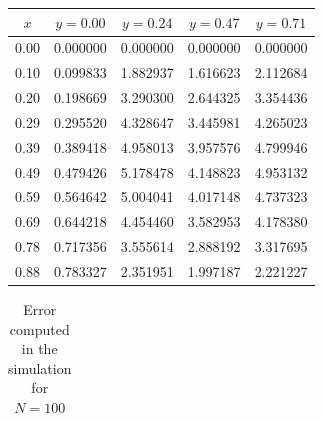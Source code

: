 \documentclass[aps,amsmath,amssymb,floatfix]{revtex4}
\begin{document}
\begin{enumerate}
\begin{enumerate}
\begin{table}[H]
\begin{tabular}{|c|c|c|c|c|}
	      	      		\textbf{$x$} & \textbf{$y = 0.00$} & \textbf{$y = 0.24$} & \textbf{$y = 0.47$} & \textbf{$y = 0.71$} \\ \hline
	      	      		0.00         & 0.000000            & 0.000000            & 0.000000            & 0.000000            \\ \hline
	      	      		0.10         & 0.099833            & 1.882937            & 1.616623            & 2.112684            \\ \hline
	      	      		0.20         & 0.198669            & 3.290300            & 2.644325            & 3.354436            \\ \hline
	      	      		0.29         & 0.295520            & 4.328647            & 3.445981            & 4.265023            \\ \hline
	      	      		0.39         & 0.389418            & 4.958013            & 3.957576            & 4.799946            \\ \hline
	      	      		0.49         & 0.479426            & 5.178478            & 4.148823            & 4.953132            \\ \hline
	      	      		0.59         & 0.564642            & 5.004041            & 4.017148            & 4.737323            \\ \hline
	      	      		0.69         & 0.644218            & 4.454460            & 3.582953            & 4.178380            \\ \hline
	      	      		0.78         & 0.717356            & 3.555614            & 2.888192            & 3.317695            \\ \hline
	      	      		0.88         & 0.783327            & 2.351951            & 1.997187            & 2.221227            \\ \hline
	      	      	\end{tabular}
	      	      \end{table}
	      	          
	      	      \begin{table}[H]
	      	      	\centering
	      	      	\caption{Error computed in the simulation for $N=100$}
	      	      	\label{tab:error_xy_100}
	      	      	\renewcommand{\arraystretch}{1.25}
	      	      	\setlength{\tabcolsep}{12pt}
	      	      	\begin{tabular}{|c|c|c|c|c|}
	      	      		\hline
	      	      		

\end{tabular}
\end{table}
\end{enumerate}
\end{enumerate}
\end{document}
